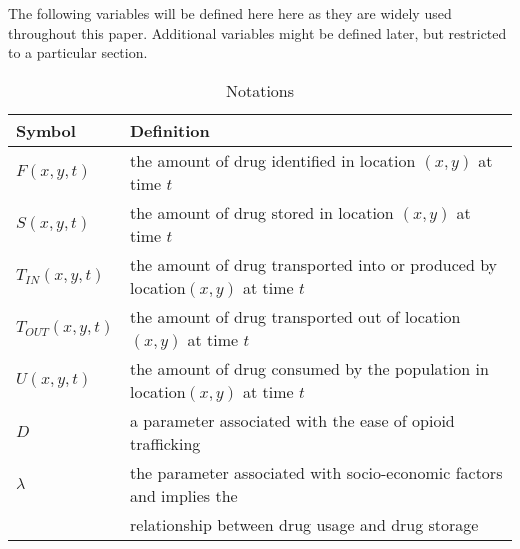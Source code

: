 The following variables will be defined here here as they are widely used throughout this paper. Additional variables might be defined later, but restricted to a particular section.

\begin{table}[H]
\centering
\begin{tabular}{|l|l|}
\hline
\rowcolor[HTML]{656565} 
{\color[HTML]{FFFFFF} \textbf{Symbol}} & {\color[HTML]{FFFFFF} \textbf{Definition}} \\ \hline
$F(x,y,t)$& the amount of drug identified in location $(x,y)$ at time $t$ \\ \hline
$S(x,y,t)$& the amount of drug stored in location $(x,y)$ at time $t$ \\ \hline
$T_{IN}(x,y,t)$&the amount of drug transported into or produced by location$(x,y)$ at time $t$  \\ \hline
$T_{OUT}(x,y,t)$&the amount of drug transported out of location$(x,y)$ at time $t$  \\ \hline
$U(x,y,t)$ & the amount of drug consumed by the population in location$(x,y)$ at time $t$  \\ \hline
$D$ & a parameter associated with the ease of opioid trafficking  \\ \hline
$\lambda$ & the parameter associated with socio-economic factors and implies the \\ & relationship between drug usage and drug storage  \\ \hline
\end{tabular}
\caption{Notations}
\end{table}